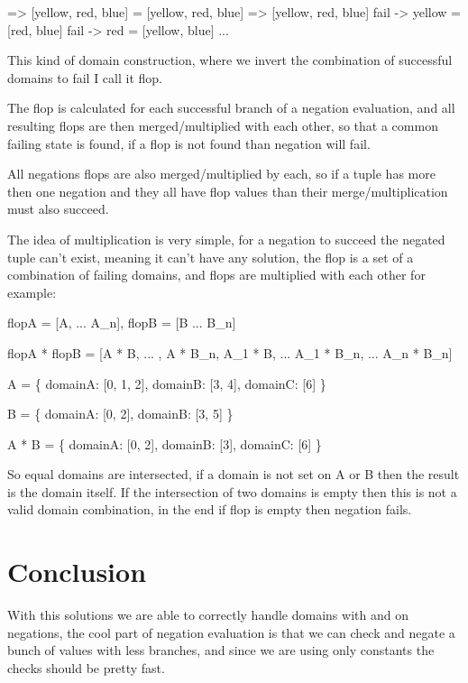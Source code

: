 \documentclass{article}
\begin{document}
=> [yellow, red, blue] = [yellow, red, blue] => [yellow, red, blue]
    fail -> yellow = [red, blue]
    fail -> red = [yellow, blue]
    ...

This kind of domain construction, where we invert the combination of successful domains to fail I call it flop.

The flop is calculated for each successful branch of a negation evaluation, and all resulting flops are then merged/multiplied 
with each other, so that a common failing state is found, if a flop is not found than negation will fail.

All negations flops are also merged/multiplied by each, so if a tuple has more then one negation and they all have flop values than 
their merge/multiplication must also succeed.

The idea of multiplication is very simple, for a negation to succeed the negated tuple can't exist, meaning it can't 
have any solution, the flop is a set of a combination of failing domains, and flops are multiplied with each other 
for example:

flopA = [A, ... A_n], flopB = [B ... B_n]

flopA * flopB = [A * B, ... , A * B_n, A_1 * B, ... A_1 * B_n, ... A_n * B_n]

A = \{
    domainA: [0, 1, 2],
    domainB: [3, 4],
    domainC: [6]
\}

B = \{
    domainA: [0, 2],
    domainB: [3, 5]
\}

A * B = \{
    domainA: [0, 2],
    domainB: [3],
    domainC: [6]
\}

So equal domains are intersected, if a domain is not set on A or B then the result is the domain itself.
If the intersection of two domains is empty then this is not a valid domain combination, in the end if flop is empty 
then negation fails.


\section{Conclusion}

With this solutions we are able to correctly handle domains with and on negations, the cool part of negation evaluation 
is that we can check and negate a bunch of values with less branches, and since we are using only constants the checks should be 
pretty fast.
\end{document}

